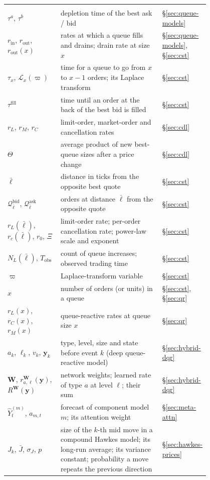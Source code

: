 \begin{center}
\begin{longtable}{>{\raggedright\arraybackslash}p{0.27\linewidth}>{\raggedright\arraybackslash}p{0.53\linewidth}l}
\midrule
\multicolumn{3}{l}{\emph{Queues}} \\
$\tau^a$, $\tau^b$ & depletion time of the best ask / bid & \S\ref{sec:queue-models} \\
$r_{\text{in}}$, $r_{\text{out}}$, $r_{\text{out}}(x)$ & rates at which a queue fills and drains; drain rate at size $x$ & \S\ref{sec:queue-models}, \S\ref{sec:cst} \\
$\tau_x$, $\mathcal{L}_x(\varpi)$ & time for a queue to go from $x$ to $x-1$ orders; its Laplace transform & \S\ref{sec:cst} \\
$\tau^{\text{fill}}$ & time until an order at the back of the best bid is filled & \S\ref{sec:cst} \\
$r_L$, $r_M$, $r_C$ & limit-order, market-order and cancellation rates & \S\ref{sec:cdl} \\
$\Theta$ & average product of new best-queue sizes after a price change & \S\ref{sec:cdl} \\
$\bar\ell$ & distance in ticks from the opposite best quote & \S\ref{sec:cst} \\
$\mathcal{Q}^{\text{bid}}_{\bar\ell}$, $\mathcal{Q}^{\text{ask}}_{\bar\ell}$ & orders at distance $\bar\ell$ from the opposite quote & \S\ref{sec:cst} \\
$r_L(\bar\ell)$, $r_c(\bar\ell)$, $r_0$, $\Xi$ & limit-order rate; per-order cancellation rate; power-law scale and exponent & \S\ref{sec:cst} \\
$N_L(\bar\ell)$, $T_{\text{obs}}$ & count of queue increases; observed trading time & \S\ref{sec:cst} \\
$\varpi$ & Laplace-transform variable & \S\ref{sec:cst} \\
$x$ & number of orders (or units) in a queue & \S\ref{sec:cst}, \S\ref{sec:qr} \\
$r_L(x)$, $r_C(x)$, $r_M(x)$ & queue-reactive rates at queue size $x$ & \S\ref{sec:qr} \\
$a_k$, $\ell_k$, $v_k$, $\mathbf{y}_k$ & type, level, size and state before event $k$ (deep queue-reactive model) & \S\ref{sec:hybrid-dqr} \\
$\mathbf{W}$, $r^{\mathbf{W}}_{a,\ell}(\mathbf{y})$, $R^{\mathbf{W}}(\mathbf{y})$ & network weights; learned rate of type $a$ at level $\ell$; their sum & \S\ref{sec:hybrid-dqr} \\
$\widehat{Y}^{(m)}_t$, $a_{m,t}$ & forecast of component model $m$; its attention weight & \S\ref{sec:meta-attn} \\
$J_k$, $\bar J$, $\sigma_J$, $p$ & size of the $k$-th mid move in a compound Hawkes model; its long-run average; its variance constant; probability a move repeats the previous direction & \S\ref{sec:hawkes-prices} \\

\end{longtable}
\end{center}
